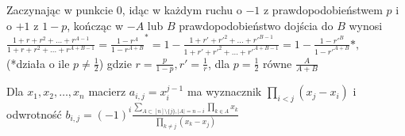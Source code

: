 Zaczynając w punkcie $0$, idąc w każdym ruchu o $-1$ z prawdopodobieństwem $p$ i o $+1$ z $1 - p$, kończąc w $-A$ lub $B$ prawdopodobieństwo dojścia do $B$ wynosi
$\frac{1 + r + r^2 + \ldots + r^{A - 1}}{1 + r + r^2 + \ldots + r^{A + B - 1}} = \frac{1 - r^A}{1 - r^{A + B}}^* = 1 - \frac{1 + r' + r'^2 + \ldots + r'^{B - 1}}{1 + r' + r'^2 + \ldots + r'^{A + B - 1}} = 1 - \frac{1 - r'^B}{1 - r'^{A + B}}*,$ \\ (*działa o ile $p \neq \frac12$) gdzie $r = \frac{p}{1 - p}, r' = \frac1r$, dla $p=\frac12$ równe $\frac{A}{A+B}$

Dla $x_1, x_2, \ldots, x_n$ macierz $a_{i,j}=x_i^{j - 1}$ ma wyznacznik $\prod\limits_{i<j}(x_j - x_i)$ i odwrotność
$b_{i,j} = (-1)^i\frac{\sum\limits_{A \subset [n]\setminus \lbrace j \rbrace, |A| = n - i}\prod\limits_{k \in A} x_k}{\prod\limits_{k\neq j}(x_k - x_j)}$
